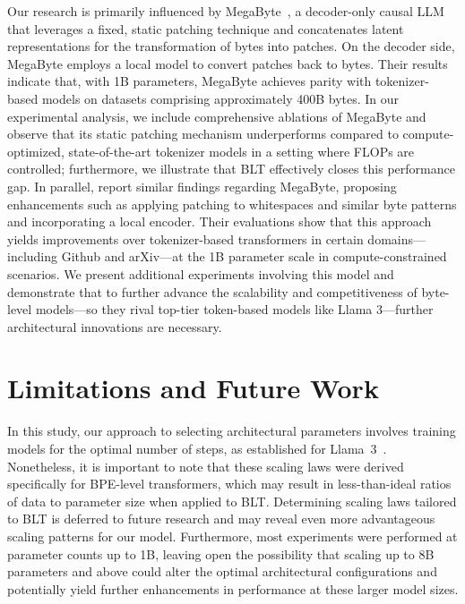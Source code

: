 Our research is primarily influenced by MegaByte~\citep{yu2023megabyte}, a decoder-only causal LLM that leverages a fixed, static patching technique and concatenates latent representations for the transformation of bytes into patches. On the decoder side, MegaByte employs a local model to convert patches back to bytes. Their results indicate that, with 1B parameters, MegaByte achieves parity with tokenizer-based models on datasets comprising approximately 400B bytes. In our experimental analysis, we include comprehensive ablations of MegaByte and observe that its static patching mechanism underperforms compared to compute-optimized, state-of-the-art tokenizer models in a setting where FLOPs are controlled; furthermore, we illustrate that {\textsc BLT} effectively closes this performance gap. In parallel, \cite{slagle2024spacebyte} report similar findings regarding MegaByte, proposing enhancements such as applying patching to whitespaces and similar byte patterns and incorporating a local encoder. Their evaluations show that this approach yields improvements over tokenizer-based transformers in certain domains—including Github and arXiv—at the 1B parameter scale in compute-constrained scenarios. We present additional experiments involving this model and demonstrate that to further advance the scalability and competitiveness of byte-level models—so they rival top-tier token-based models like Llama 3—further architectural innovations are necessary.

\section{Limitations and Future Work}

In this study, our approach to selecting architectural parameters involves training models for the optimal number of steps, as established for Llama~3~\citep{dubey2024llama}. Nonetheless, it is important to note that these scaling laws were derived specifically for BPE-level transformers, which may result in less-than-ideal ratios of data to parameter size when applied to {\textsc BLT}. Determining scaling laws tailored to {\textsc BLT} is deferred to future research and may reveal even more advantageous scaling patterns for our model. Furthermore, most experiments were performed at parameter counts up to 1B, leaving open the possibility that scaling up to 8B parameters and above could alter the optimal architectural configurations and potentially yield further enhancements in performance at these larger model sizes.

